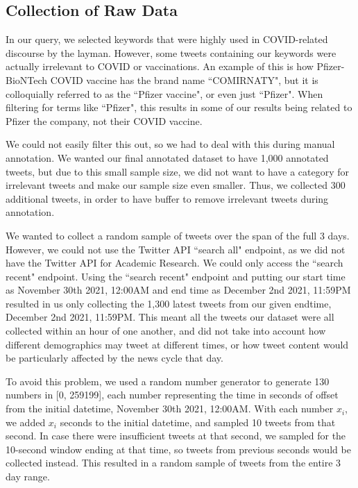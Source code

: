 \documentclass[letterpaper]{article} %
\begin{document}
\subsection{Collection of Raw Data}
In our query, we selected keywords that were highly used in COVID-related discourse by the layman. However, some tweets containing our keywords were actually irrelevant to COVID or vaccinations. An example of this is how Pfizer-BioNTech COVID vaccine has the brand name ``COMIRNATY", but it is colloquially referred to as the ``Pfizer vaccine", or even just ``Pfizer". When filtering for terms like ``Pfizer", this results in some of our results being related to Pfizer the company, not their COVID vaccine. \par
We could not easily filter this out, so we had to deal with this during manual annotation. We wanted our final annotated dataset to have 1,000 annotated tweets, but due to this small sample size, we did not want to have a category for irrelevant tweets and make our sample size even smaller. Thus, we collected 300 additional tweets, in order to have buffer to remove irrelevant tweets during annotation. \par
We wanted to collect a random sample of tweets over the span of the full 3 days. However, we could not use the Twitter API ``search all" endpoint, as we did not have the Twitter API for Academic Research. We could only access the ``search recent" endpoint. Using the ``search recent" endpoint and putting our start time as November 30th 2021, 12:00AM and end time as December 2nd 2021, 11:59PM resulted in us only collecting the 1,300 latest tweets from our given endtime, December 2nd 2021, 11:59PM. This meant all the tweets our dataset were all collected within an hour of one another, and did not take into account how different demographics may tweet at different times, or how tweet content would be particularly affected by the news cycle that day. \par
To avoid this problem, we used a random number generator to generate 130 numbers in [0, 259199], each number representing the time in seconds of offset from the initial datetime, November 30th 2021, 12:00AM. With each number $x_i$, we added $x_i$ seconds to the initial datetime, and sampled 10 tweets from that second. In case there were insufficient tweets at that second, we sampled for the 10-second window ending at that time, so tweets from previous seconds would be collected instead. This resulted in a random sample of tweets from the entire 3 day range. 
\end{document}

